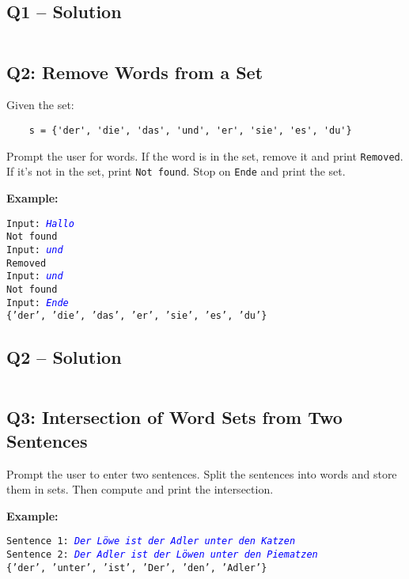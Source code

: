 \documentclass[a4paper,11pt]{article}
\begin{document}
\subsection*{Q1 – Solution}
\inputminted{python}{Files/9/1.py}

\subsection*{Q2: Remove Words from a Set}
Given the set:

\begin{verbatim}
	s = {'der', 'die', 'das', 'und', 'er', 'sie', 'es', 'du'}
\end{verbatim}

Prompt the user for words. If the word is in the set, remove it and print \texttt{Removed}. If it’s not in the set, print \texttt{Not found}. Stop on \texttt{Ende} and print the set.

\textbf{Example:}
\begin{flushleft}
	\texttt{Input: \textcolor{blue}{\textit{Hallo}}}\\
	\texttt{Not found}\\
	\texttt{Input: \textcolor{blue}{\textit{und}}}\\
	\texttt{Removed}\\
	\texttt{Input: \textcolor{blue}{\textit{und}}}\\
	\texttt{Not found}\\
	\texttt{Input: \textcolor{blue}{\textit{Ende}}}\\
	\texttt{\{'der', 'die', 'das', 'er', 'sie', 'es', 'du'\}}
\end{flushleft}

\subsection*{Q2 – Solution}
\inputminted{python}{Files/9/2.py}

\subsection*{Q3: Intersection of Word Sets from Two Sentences}
Prompt the user to enter two sentences. Split the sentences into words and store them in sets. Then compute and print the intersection.

\textbf{Example:}
\begin{flushleft}
	\texttt{Sentence 1: \textcolor{blue}{\textit{Der Löwe ist der Adler unter den Katzen}}}\\
	\texttt{Sentence 2: \textcolor{blue}{\textit{Der Adler ist der Löwen unter den Piematzen}}}\\
	\texttt{\{'der', 'unter', 'ist', 'Der', 'den', 'Adler'\}}
\end{flushleft}
\end{document}
